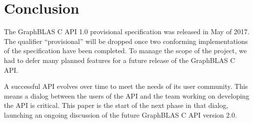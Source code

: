 %
%
\section{Conclusion}
\label{sec:conclusion}

The GraphBLAS C API 1.0 provisional specification was released in May of 2017.  The qualifier ``provisional'' will be dropped once
two conforming implementations of the specification have been completed.  To manage the scope of the project,
we had to defer many planned features for a future release of the GraphBLAS C API.  

A successful API evolves over time to meet the needs of its user community.   This means a dialog
between the users of the API and the team working on developing the API is critical.  This paper is the start of the next
phase in that dialog, launching an ongoing discussion of the future GraphBLAS C API version 2.0.
